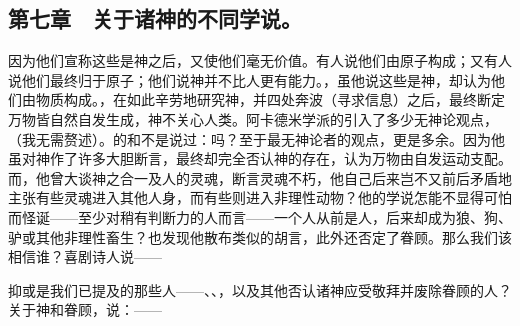 
\subsection{第七章　关于诸神的不同学说。}

因为他们宣称这些是神之后，又使他们毫无价值。有人说他们由原子构成；又有人说他们最终归于原子；他们说神并不比人更有能力。，虽他说这些是神，却认为他们由物质构成。，在如此辛劳地研究神，并四处奔波（寻求信息）之后，最终断定万物皆自然自发生成，神不关心人类。阿卡德米学派的引入了多少无神论观点，（我无需赘述）。的和不是说过：吗？至于最无神论者的观点，更是多余。因为他虽对神作了许多大胆断言，最终却完全否认神的存在，认为万物由自发运动支配。而，他曾大谈神之合一及人的灵魂，断言灵魂不朽，他自己后来岂不又前后矛盾地主张有些灵魂进入其他人身，而有些则进入非理性动物？他的学说怎能不显得可怕而怪诞——至少对稍有判断力的人而言——一个人从前是人，后来却成为狼、狗、驴或其他非理性畜生？也发现他散布类似的胡言，此外还否定了眷顾。那么我们该相信谁？喜剧诗人说——\par

\par

抑或是我们已提及的那些人——、、，以及其他否认诸神应受敬拜并废除眷顾的人？关于神和眷顾，说：——\par

\par


